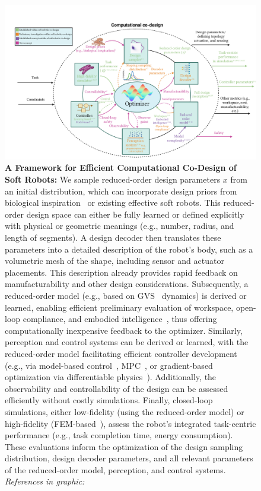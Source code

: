 \begin{figure}[h!]
    \centering
    \includegraphics[width=1\linewidth]{appendix-holistic-codesign/figures/computational_codesign_v1.pdf}
    \caption{\textbf{A Framework for Efficient Computational Co-Design of Soft Robots:}
        We sample reduced-order design parameters $x$ from an initial distribution, which can incorporate design priors from biological inspiration~\citep{mazzolai2020vision, chen2020design, laschi2024bioinspiration} or existing effective soft robots. This reduced-order design space can either be fully learned or defined explicitly with physical or geometric meanings (e.g., number, radius, and length of segments). A design decoder then translates these parameters into a detailed description of the robot’s body, such as a volumetric mesh of the shape, including sensor and actuator placements. This description already provides rapid feedback on manufacturability and other design considerations. Subsequently, a reduced-order model (e.g., based on \gls{GVS}~\citep{renda2020geometric} dynamics) is derived or learned, enabling efficient preliminary evaluation of workspace, open-loop compliance, and embodied intelligence~\citep{cianchetti2021embodied, mengaldo2022concise, vihmar2023measure}, thus offering computationally inexpensive feedback to the optimizer. Similarly, perception and control systems can be derived or learned, with the reduced-order model facilitating efficient controller development (e.g., via model-based control~\citep{della2023model}, \gls{MPC}~\citep{alora2023data}, or gradient-based optimization via differentiable physics~\citep{spielberg2019learning, wang2023softzoo}). Additionally, the observability and controllability of the design can be assessed efficiently without costly simulations. Finally, closed-loop simulations, either low-fidelity (using the reduced-order model) or high-fidelity (\gls{FEM}-based~\citep{coevoet2017software}), assess the robot’s integrated task-centric performance (e.g., task completion time, energy consumption). These evaluations inform the optimization of the design sampling distribution, design decoder parameters, and all relevant parameters of the reduced-order model, perception, and control systems. \emph{References in graphic:}  
}
\end{figure}
